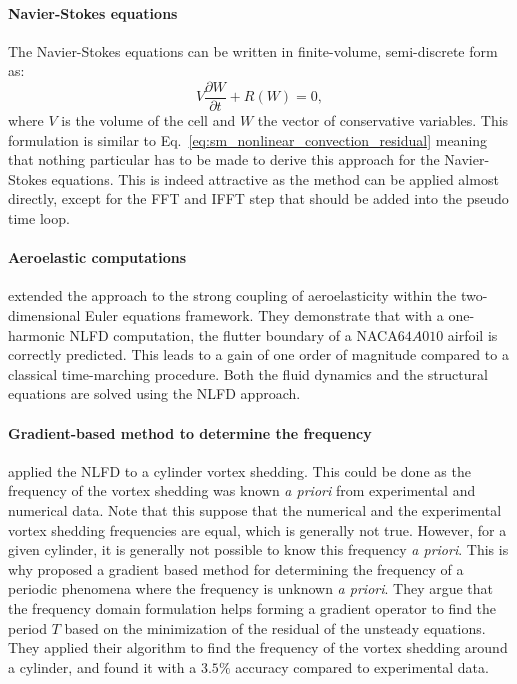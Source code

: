 \paragraph{Navier-Stokes equations}
The Navier-Stokes equations can be written in finite-volume,
semi-discrete form as:
\begin{equation}
	V \frac{\partial W}{\partial t} + R(W) = 0,
	\label{eq:navier_stokes_fv_sd}
\end{equation}
where $V$ is the volume of the cell and $W$
the vector of conservative variables.
This formulation is similar to
Eq.~\eqref{eq:sm_nonlinear_convection_residual} meaning that
nothing particular has to be made to derive this approach for
the Navier-Stokes equations. This is indeed attractive as the
method can be applied almost directly, except for the FFT and IFFT
step that should be added into the pseudo time loop.

\paragraph{Aeroelastic computations}
\citet{Kachra2008} extended the approach to the strong coupling of
aeroelasticity within the two-dimensional Euler equations framework.
They demonstrate that with a one-harmonic NLFD computation, the
flutter boundary of a NACA$64A010$ airfoil is correctly predicted.
This leads to a gain of one order of magnitude compared to a classical
time-marching procedure. Both the fluid dynamics and the structural equations
are solved using the NLFD approach.

\paragraph{Gradient-based method to determine the frequency}
\citet{McMullen2001} applied the NLFD to a cylinder
vortex shedding. This could be done as the frequency of the
vortex shedding was known \emph{a priori} from experimental
and numerical data. Note that this suppose that the
numerical and the experimental vortex shedding frequencies
are equal, which is generally not true.
However, for a given cylinder, it is generally not
possible to know this frequency \emph{a priori}. This is why
\citet{McMullen2002, McMullen2006a}
proposed a gradient based method for determining the frequency
of a periodic phenomena where the frequency is unknown
\emph{a priori}. They argue that the frequency domain formulation
helps forming a gradient operator to find the period $T$ based
on the minimization of the residual of the unsteady equations.
They applied their algorithm to find the frequency of the vortex
shedding around a cylinder, and found it with a $3.5\%$ accuracy
compared to experimental data.

